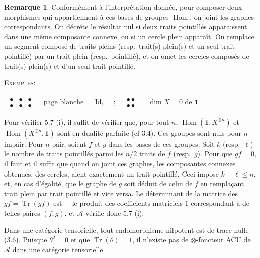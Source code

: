 \documentclass[11pt,a4paper]{article}
\theoremstyle{plain}
\theoremstyle{definition}
\newtheorem{remark}[theorem]{Remarque}
\DeclareMathOperator{\Hom}{Hom}
\DeclareMathOperator{\Tr}{Tr}
\DeclareMathOperator{\Id}{Id}
\begin{document}
\begin{remark}
Conform\'ement \`a l'interpr\'etation donn\'ee, pour composer deux morphismes qui appartiennent \`a ces bases de groupes $\Hom$, on joint les graphes correspondants. On d\'ecr\'ete le r\'esultat nul si deux traits pointill\'es apparaissent dans une m\^eme composante connexe, ou si un cercle plein appara\^it. On remplace un segment compos\'e de traits pleins (resp.~trait(s) plein(s) et un seul trait pointill\'e) par un trait plein (resp.~pointill\'e), et on omet les cercles compos\'es de trait(s) plein(s) et d'un seul trait pointill\'e.

\textsc{Exemples}:

\begin{center}
$\begin{array}{c}
\begin{array}{ccc}
\bullet & \bullet & \bullet \\
\bullet & \bullet & \bullet
\end{array}
= \text{page blanche} = \Id_{\mathbf{1}} \quad ; \quad
\begin{array}{c}
\bullet \bullet \\
\bullet \bullet
\end{array}
= \dim X = 0 \text{ de } \mathbf{1}
\end{array}$
\end{center}

Pour v\'erifier 5.7 (i), il suffit de v\'erifier que, pour tout $n$, $\Hom(\mathbf{1}, X^{\otimes n})$ et $\Hom(X^{\otimes n}, \mathbf{1})$ sont en dualit\'e parfaite (cf 3.4). Ces groupes sont nuls pour $n$ impair. Pour $n$ pair, soient $f$ et $g$ dans les bases de ces groupes. Soit $k$ (resp.~$\ell$) le nombre de traits pointill\'es parmi les $n/2$ traits de $f$ (resp.~$g$). Pour que $gf = 0$, il faut et il suffit que quand on joint ces graphes, les composantes connexes obtenues, des cercles, aient exactement un trait pointill\'e. Ceci impose $k + \ell \leq n$, et, en cas d'\'egalit\'e, que le graphe de $g$ soit d\'eduit de celui de $f$ en rempla\c{c}ant trait plein par trait pointill\'e et vice versa. Le d\'eterminant de la matrice des $gf = \Tr(gf)$ est $\pm$ le produit des coefficients matriciels $1$ correspondant \`a de telles paires $(f, g)$, et $\mathcal{A}$ v\'erifie donc 5.7 (i).

Dans une cat\'egorie tensorielle, tout endomorphisme nilpotent est de trace nulle (3.6). Puisque $\theta^2 = 0$ et que $\Tr(\theta) = 1$, il n'existe pas de $\otimes$-foncteur ACU de $\mathcal{A}$ dans une cat\'egorie tensorielle.
\end{remark}
\end{document}
